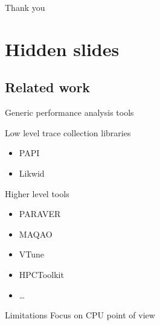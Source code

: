 \documentclass[xcolor={usenames,dvipsnames},hyperref={pdfusetitle}]{beamer}
\begin{document}
\setcounter{finalframe}{\value{framenumber}}

\begin{frame}{}
    \centering
    \Huge
    Thank you
\end{frame}

\section*{Hidden slides}

\subsection*{Related work}
\setcounter{framenumber}{\value{finalframe}}
\begin{frame}{Generic performance analysis tools}
    \begin{block}{Low level trace collection libraries}
        \begin{itemize}
            \item PAPI~\cite{Browne00Portable}
            \item Likwid~\cite{Treibig10LIKWID}
        \end{itemize}
    \end{block}
    \pause
    \begin{block}{Higher level tools}
        \begin{itemize}
            \item PARAVER~\cite{Pillet95PARAVER}
            \item MAQAO~\cite{Djoudi05MAQAO}
            \item VTune~\cite{Reinders05VTune}
            \item HPCToolkit~\cite{Adhianto10HPCTOOLKIT}
            \item \ldots
        \end{itemize}
    \end{block}
    \pause
    \begin{alertblock}{Limitations}
        Focus on CPU point of view
    \end{alertblock}
\end{frame}
\end{document}
